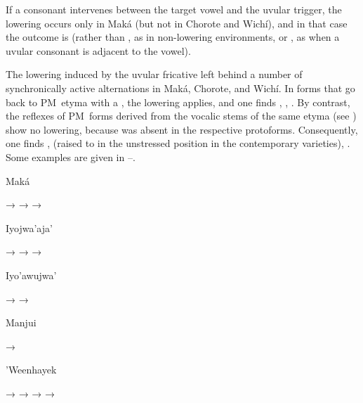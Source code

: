 If a consonant intervenes between the target vowel and the uvular trigger, the lowering occurs only in Maká (but not in Chorote and Wichí), and in that case the outcome is  (rather than , as in non-lowering environments, or , as when a uvular consonant is adjacent to the vowel).

\begin{exe}
    \ex \redquebracho
\end{exe}

The lowering induced by the uvular fricative left behind a number of synchronically active alternations in Maká, Chorote, and Wichí. In forms that go back to PM~etyma with a , the lowering applies, and one finds , , . By contrast, the reflexes of PM~forms derived from the vocalic stems of the same etyma (see ) show no lowering, because  was absent in the respective protoforms. Consequently, one finds ,  (raised to  in the unstressed position in the contemporary varieties), . Some examples are given in --.

\ea\label{ex:uvullow:maka}
        Maká \citep[121, 130, 183]{AG99}
    \begin{xlist}
        \ex {} → 
        \ex {} → 
        \ex {} → 
    \end{xlist}
\z
\ea
        Iyojwa’aja’ \citep[96, 143, 144]{ND09}
    \begin{xlist}
        \ex {} → 
        \ex {} → 
        \ex {} → 
    \end{xlist}
\z
\ea
        Iyo’awujwa’ \citep[120, 166]{AG83}
    \begin{xlist}
        \ex {} → 
        \ex {} → 
    \end{xlist}
\z
\ea
        Manjui \citep{JC18}
    \begin{xlist}
        \ex {} → 
    \end{xlist}
\z
\ea\label{ex:uvullow:whk}
        ’Weenhayek \citep[8, 92, 293,  297, 426]{KC16}
    \begin{xlist}
        \ex {} → 
        \ex {} → 
        \ex {} → 
        \ex {} → 
    \end{xlist}
\z
{}

